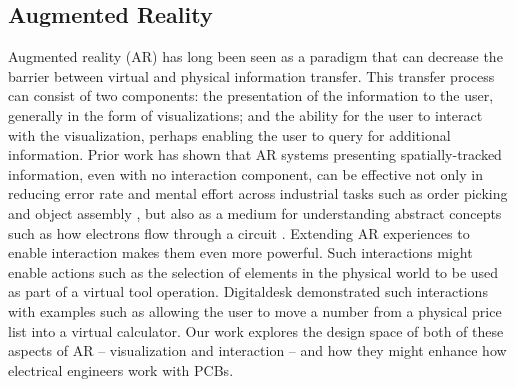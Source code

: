 \documentclass [11pt, proquest] {uwthesis}[2020/02/24]
\begin{document}
\subsection{Augmented Reality}%
\label{subsec: Augmented Reality}%
Augmented reality (AR) has long been seen as a paradigm that can decrease the barrier between virtual and physical information transfer.
This transfer process can consist of two components: the presentation of the information to the user, generally in the form of visualizations; and the ability for the user to interact with the visualization, perhaps enabling the user to query for additional information.
Prior work has shown that AR systems presenting spatially-tracked information, even with no interaction component, can be effective not only in reducing error rate and mental effort across industrial tasks such as order picking \cite{Schwerdtfeger2008SupportingReality} and object assembly \cite{Caudell1992AugmentedProcesses, Tang2003ComparativeAssembly}, but also as a medium for understanding abstract concepts such as how electrons flow through a circuit \cite{Conradi2011FlowElectrons, Chan2013LightUp}.
Extending AR experiences to enable interaction makes them even more powerful.
Such interactions might enable actions such as the selection of elements in the physical world to be used as part of a virtual tool operation.
Digitaldesk \cite{Wellner1993InteractingDigitaldesk} demonstrated such interactions with examples such as allowing the user to move a number from a physical price list into a virtual calculator.
Our work explores the design space of both of these aspects of AR -- visualization and interaction -- and how they might enhance how electrical engineers work with PCBs.


\end{document}
